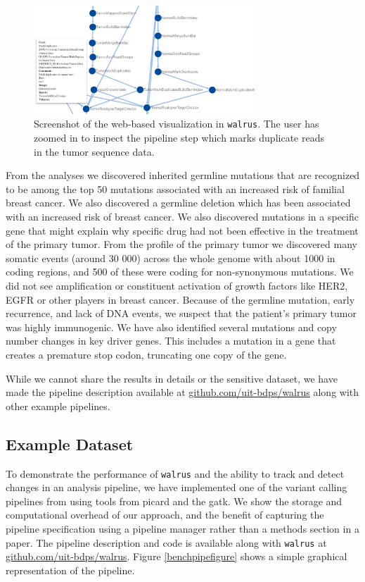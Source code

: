 \begin{figure}
\includegraphics[width=8.3cm]{figures/webshot.png}
    \caption{Screenshot of the web-based visualization in \texttt{walrus}. The
    user has zoomed in to inspect the pipeline step which marks duplicate reads
    in the tumor sequence data.}
    \label{webshotfig}
\end{figure} 


From the analyses we discovered inherited germline mutations that are recognized
to be among the top 50 mutations associated with an increased risk of familial
breast cancer. We also discovered a germline deletion which has been associated
with an increased risk of breast cancer. We also discovered mutations in a
specific gene that might explain why specific drug had not been effective in the
treatment of the primary tumor. From the profile of the primary tumor we
discovered many somatic events (around 30 000) across the whole genome with
about 1000 in coding regions, and 500 of these were coding for non-synonymous
mutations.  We did not see amplification or constituent activation of growth
factors like HER2, EGFR or other players in breast cancer. Because of the
germline mutation, early recurrence, and lack of DNA events, we suspect that the
patient's primary tumor was highly immunogenic. We have also identified several
mutations and copy number changes in key driver genes. This includes a mutation
in a gene that creates a premature stop codon, truncating one copy of the gene.

While we cannot share the results in details or the sensitive dataset, we have
made the pipeline description available at \url{github.com/uit-bdps/walrus}
along with other example pipelines. 

\subsection{Example Dataset}
To demonstrate the performance of \texttt{walrus} and the ability to track and
detect changes in an analysis pipeline, we have implemented one of the variant
calling pipelines from \cite{cornish2015comparison} using tools from picard and
the \gls{gatk}. We show the storage and computational overhead of our approach,
and the benefit of capturing the pipeline specification using a pipeline manager
rather than a methods section in a paper. The pipeline description and code is
available along with \texttt{walrus} at \url{github.com/uit-bdps/walrus}. Figure
\ref{benchpipefigure} shows a simple graphical representation of the pipeline. 

